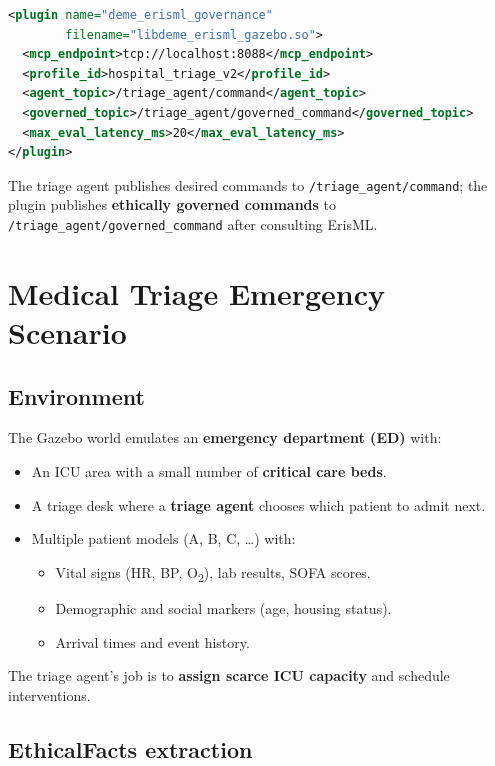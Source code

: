 \documentclass[11pt]{article}
\begin{document}
\begin{lstlisting}[language=XML]
<plugin name="deme_erisml_governance"
        filename="libdeme_erisml_gazebo.so">
  <mcp_endpoint>tcp://localhost:8088</mcp_endpoint>
  <profile_id>hospital_triage_v2</profile_id>
  <agent_topic>/triage_agent/command</agent_topic>
  <governed_topic>/triage_agent/governed_command</governed_topic>
  <max_eval_latency_ms>20</max_eval_latency_ms>
</plugin>
\end{lstlisting}

The triage agent publishes desired commands to \texttt{/triage\_agent/command}; the plugin publishes \textbf{ethically governed commands} to \texttt{/triage\_agent/governed\_command} after consulting ErisML.

\section{Medical Triage Emergency Scenario}

\subsection{Environment}

The Gazebo world emulates an \textbf{emergency department (ED)} with:

\begin{itemize}
  \item An ICU area with a small number of \textbf{critical care beds}.
  \item A triage desk where a \textbf{triage agent} chooses which patient to admit next.
  \item Multiple patient models (A, B, C, \ldots) with:
    \begin{itemize}
      \item Vital signs (HR, BP, O\textsubscript{2}), lab results, SOFA scores.
      \item Demographic and social markers (age, housing status).
      \item Arrival times and event history.
    \end{itemize}
\end{itemize}

The triage agent's job is to \textbf{assign scarce ICU capacity} and schedule interventions.

\subsection{EthicalFacts extraction}
\end{document}
